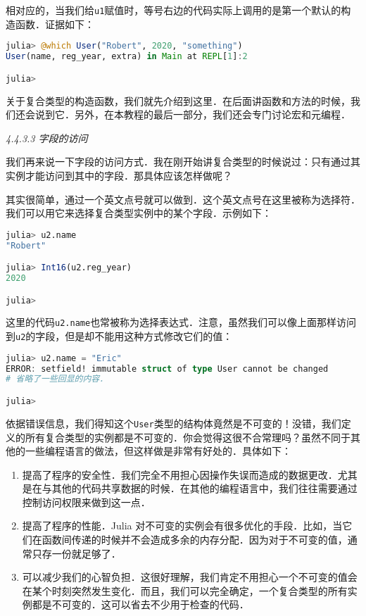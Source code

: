 相对应的，当我们给\verb|u1|赋值时，等号右边的代码实际上调用的是第一个默认的构造函数．证据如下：

\begin{lstlisting}[language=julia]
julia> @which User("Robert", 2020, "something")
User(name, reg_year, extra) in Main at REPL[1]:2

julia> 
\end{lstlisting}

关于复合类型的构造函数，我们就先介绍到这里．在后面讲函数和方法的时候，我们还会说到它．另外，在本教程的最后一部分，我们还会专门讨论宏和元编程．

\textsl{4.4.3.3 字段的访问}

我们再来说一下字段的访问方式．我在刚开始讲复合类型的时候说过：只有通过其实例才能访问到其中的字段．那具体应该怎样做呢？

其实很简单，通过一个英文点号就可以做到．这个英文点号在这里被称为选择符．我们可以用它来选择复合类型实例中的某个字段．示例如下：

\begin{lstlisting}[language=julia]
julia> u2.name
"Robert"

julia> Int16(u2.reg_year)
2020

julia> 
\end{lstlisting}

这里的代码\verb|u2.name|也常被称为选择表达式．注意，虽然我们可以像上面那样访问到\verb|u2|的字段，但是却不能用这种方式修改它们的值：

\begin{lstlisting}[language=julia]
julia> u2.name = "Eric"
ERROR: setfield! immutable struct of type User cannot be changed
# 省略了一些回显的内容．

julia> 
\end{lstlisting}

依据错误信息，我们得知这个\verb|User|类型的结构体竟然是不可变的！没错，我们定义的所有复合类型的实例都是不可变的．你会觉得这很不合常理吗？虽然不同于其他的一些编程语言的做法，但这样做是非常有好处的．具体如下：

\begin{enumerate}
\item 提高了程序的安全性．我们完全不用担心因操作失误而造成的数据更改．尤其是在与其他的代码共享数据的时候．在其他的编程语言中，我们往往需要通过控制访问权限来做到这一点．
\item 提高了程序的性能．Julia 对不可变的实例会有很多优化的手段．比如，当它们在函数间传递的时候并不会造成多余的内存分配．因为对于不可变的值，通常只存一份就足够了．
\item 可以减少我们的心智负担．这很好理解，我们肯定不用担心一个不可变的值会在某个时刻突然发生变化．而且，我们可以完全确定，一个复合类型的所有实例都是不可变的．这可以省去不少用于检查的代码．
\end{enumerate}

